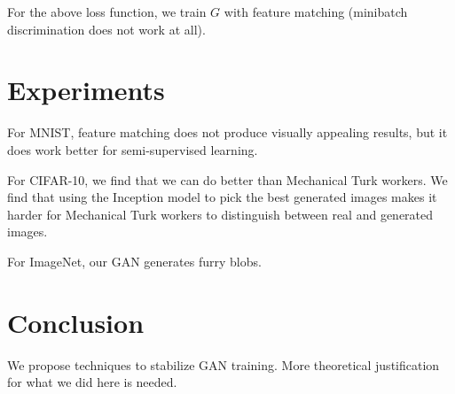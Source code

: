 \documentclass[a4paper]{article}
\begin{document}
For the above loss function, we train $G$ with feature matching (minibatch
discrimination does not work at all).

\section{Experiments}
For MNIST, feature matching does not produce visually appealing results, but
it does work better for semi-supervised learning.

For CIFAR-10, we find that we can do better than Mechanical Turk workers.
We find that using the Inception model to pick the best generated images
makes it harder for Mechanical Turk workers to distinguish between real and
generated images.

For ImageNet, our GAN generates furry blobs.

\section{Conclusion}
We propose techniques to stabilize GAN training. More theoretical justification
for what we did here is needed.
\end{document}
